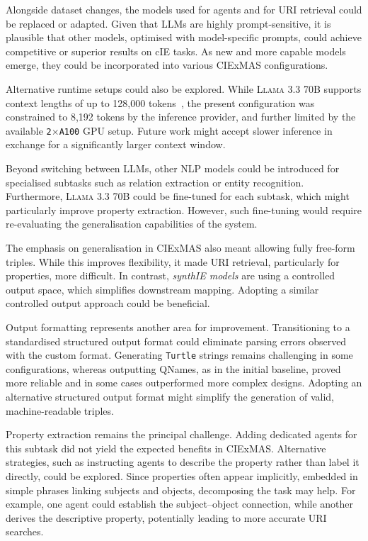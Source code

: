 \documentclass[a4paper,oneside,bibliography=totoc]{scrbook}
\begin{document}
Alongside dataset changes, the models used for agents and for \ac{URI} retrieval could be replaced or adapted. Given that \acp{LLM} are highly prompt-sensitive, it is plausible that other models, optimised with model-specific prompts, could achieve competitive or superior results on \ac{cIE} tasks. As new and more capable models emerge, they could be incorporated into various CIExMAS configurations.

Alternative runtime setups could also be explored. While \textsc{Llama 3.3 70B} supports context lengths of up to 128{,}000 tokens~\cite{Meta2024}, the present configuration was constrained to 8{,}192 tokens by the inference provider, and further limited by the available \texttt{2$\times$A100} GPU setup. Future work might accept slower inference in exchange for a significantly larger context window.

Beyond switching between \acp{LLM}, other \ac{NLP} models could be introduced for specialised subtasks such as relation extraction or entity recognition. Furthermore, \textsc{Llama 3.3 70B} could be fine-tuned for each subtask, which might particularly improve property extraction. However, such fine-tuning would require re-evaluating the generalisation capabilities of the system.

The emphasis on generalisation in CIExMAS also meant allowing fully free-form triples. While this improves flexibility, it made \ac{URI} retrieval, particularly for properties, more difficult. In contrast, \textit{synthIE models} are using a controlled output space, which simplifies downstream mapping. Adopting a similar controlled output approach could be beneficial.

Output formatting represents another area for improvement. Transitioning to a standardised structured output format could eliminate parsing errors observed with the custom format. Generating \texttt{Turtle} strings remains challenging in some configurations, whereas outputting QNames, as in the initial baseline, proved more reliable and in some cases outperformed more complex designs. Adopting an alternative structured output format might simplify the generation of valid, machine-readable triples.

Property extraction remains the principal challenge. Adding dedicated agents for this subtask did not yield the expected benefits in CIExMAS. Alternative strategies, such as instructing agents to describe the property rather than label it directly, could be explored. Since properties often appear implicitly, embedded in simple phrases linking subjects and objects, decomposing the task may help. For example, one agent could establish the subject–object connection, while another derives the descriptive property, potentially leading to more accurate \ac{URI} searches.
\end{document}
